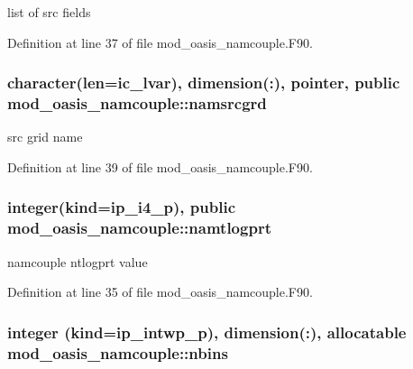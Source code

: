 list of src fields 



Definition at line 37 of file mod\+\_\+oasis\+\_\+namcouple.\+F90.

\hypertarget{classmod__oasis__namcouple_a589c1bae58b10bcb0cfb30c0893a7895}{
\subsubsection[{namsrcgrd}]{\setlength{\rightskip}{0pt plus 5cm}character(len=ic\+\_\+lvar), dimension(\+:), pointer, public mod\+\_\+oasis\+\_\+namcouple\+::namsrcgrd}}\label{classmod__oasis__namcouple_a589c1bae58b10bcb0cfb30c0893a7895}


src grid name 



Definition at line 39 of file mod\+\_\+oasis\+\_\+namcouple.\+F90.

\hypertarget{classmod__oasis__namcouple_a45fbbd2941f5d71991d409f63e31cf02}{
\subsubsection[{namtlogprt}]{\setlength{\rightskip}{0pt plus 5cm}integer(kind=ip\+\_\+i4\+\_\+p), public mod\+\_\+oasis\+\_\+namcouple\+::namtlogprt}}\label{classmod__oasis__namcouple_a45fbbd2941f5d71991d409f63e31cf02}


namcouple ntlogprt value 



Definition at line 35 of file mod\+\_\+oasis\+\_\+namcouple.\+F90.

\hypertarget{classmod__oasis__namcouple_a4c609c48a20205e1d2aa9938d7babc92}{
\subsubsection[{nbins}]{\setlength{\rightskip}{0pt plus 5cm}integer (kind=ip\+\_\+intwp\+\_\+p), dimension(\+:), allocatable mod\+\_\+oasis\+\_\+namcouple\+::nbins\hspace{0.3cm}{\ttfamily [private]}}}\label{classmod__oasis__namcouple_a4c609c48a20205e1d2aa9938d7babc92}



